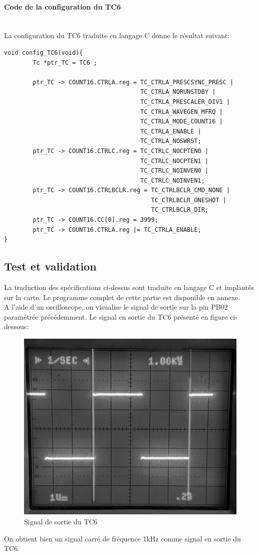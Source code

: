 \documentclass[a4paper]{article}
\begin{document}
	\newpage 
		\paragraph{Code de la configuration du TC6} ~~\\
	La configuration du TC6 traduite en langage C donne le résultat suivant:
	\begin{lstlisting}[style=CStyle]
void config_TC6(void){
	    Tc *ptr_TC = TC6 ;
	
	    ptr_TC -> COUNT16.CTRLA.reg = TC_CTRLA_PRESCSYNC_PRESC |
	                                  TC_CTRLA_NORUNSTDBY |
	                                  TC_CTRLA_PRESCALER_DIV1 |
	                                  TC_CTRLA_WAVEGEN_MFRQ |
	                                  TC_CTRLA_MODE_COUNT16 |
	                                  TC_CTRLA_ENABLE |			
	                                  TC_CTRLA_NOSWRST;
	    ptr_TC -> COUNT16.CTRLC.reg = TC_CTRLC_NOCPTEN0 |
	                                  TC_CTRLC_NOCPTEN1 |
	                                  TC_CTRLC_NOINVEN0 |
	                                  TC_CTRLC_NOINVEN1;
	    ptr_TC -> COUNT16.CTRLBCLR.reg = TC_CTRLBCLR_CMD_NONE |
	                                     TC_CTRLBCLR_ONESHOT |
                                    	 TC_CTRLBCLR_DIR;
    	ptr_TC -> COUNT16.CC[0].reg = 3999;
    	ptr_TC -> COUNT16.CTRLA.reg |= TC_CTRLA_ENABLE;
}
	\end{lstlisting}
	
	\subsection{Test et validation}
	La traduction des spécifications ci-dessus sont traduite en langage C et implantés sur la carte. Le programme complet de cette partie est disponible en annexe.\\
	A l’aide d’un oscilloscope, on visualise le signal de sortie sur la pin PB02 paramétrée précédemment. Le signal en sortie du TC6 présenté en figure ci-dessous:
	\begin{figure}[H]
		\centering
		\includegraphics[width=0.6\linewidth]{chrono_valide_etape2.jpg}
		\caption{Signal de sortie du TC6}
	\end{figure}
	On obtient bien un signal carré de fréquence 1kHz comme signal en sortie du TC6.
	
\end{document}
